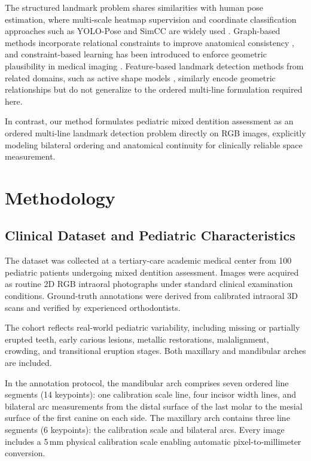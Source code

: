 \documentclass[conference]{IEEEtran}
\begin{document}
The structured landmark problem shares similarities with human pose estimation, where
multi-scale heatmap supervision and coordinate classification approaches such as YOLO-Pose and
SimCC are widely used \cite{newell2016stacked,maji2022yolo,li2022simcc}. Graph-based methods
incorporate relational constraints to improve anatomical consistency \cite{li2020graphlandmark},
and constraint-based learning has been introduced to enforce geometric plausibility in medical
imaging \cite{oktay2018anatomically}. Feature-based landmark detection methods from related
domains, such as active shape models \cite{cootes1995asm}, similarly encode geometric
relationships but do not generalize to the ordered multi-line formulation required here.

In contrast, our method formulates pediatric mixed dentition assessment as an ordered multi-line
landmark detection problem directly on RGB images, explicitly modeling bilateral ordering and
anatomical continuity for clinically reliable space measurement.

\section{Methodology}

\subsection{Clinical Dataset and Pediatric Characteristics}

The dataset was collected at a tertiary-care academic medical center from 100 pediatric patients
undergoing mixed dentition assessment. Images were acquired as routine 2D RGB intraoral
photographs under standard clinical examination conditions. Ground-truth annotations were
derived from calibrated intraoral 3D scans and verified by experienced orthodontists.

The cohort reflects real-world pediatric variability, including missing or partially erupted
teeth, early carious lesions, metallic restorations, malalignment, crowding, and transitional
eruption stages. Both maxillary and mandibular arches are included.

In the annotation protocol, the mandibular arch comprises seven ordered line segments
(14 keypoints): one calibration scale line, four incisor width lines, and bilateral arc
measurements from the distal surface of the last molar to the mesial surface of the first
canine on each side. The maxillary arch contains three line segments (6 keypoints): the
calibration scale and bilateral arcs. Every image includes a 5\,mm physical calibration scale
enabling automatic pixel-to-millimeter conversion.
\end{document}
